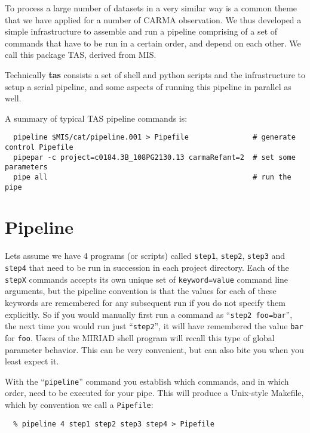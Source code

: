 \documentclass[preprint]{aastex} %
\begin{document}
To process a large number of datasets in a very similar 
way is a common theme that we have applied for a number of CARMA
observation. We thus developed
a simple infrastructure to assemble and run a pipeline comprising
of a set of commands that have to be run in a certain order,
and depend on each other. We call this 
package TAS, derived from MIS.

Technically {\bf tas} consists a set of shell and python scripts
and the infrastructure to setup a serial pipeline, and some aspects
of running this pipeline in parallel as well.

A summary of typical TAS pipeline commands is:

\footnotesize
\begin{verbatim}
  pipeline $MIS/cat/pipeline.001 > Pipefile               # generate control Pipefile
  pipepar -c project=c0184.3B_108PG2130.13 carmaRefant=2  # set some parameters
  pipe all                                                # run the pipe
\end{verbatim}
\normalsize   


\section{Pipeline}

Lets assume we have 4 programs (or scripts) called {\tt step1},
{\tt step2}, {\tt step3} and {\tt step4} that need to be run in
succession in each project directory. 
Each of the {\tt stepX} 
commands accepts its own unique set of {\tt keyword=value}
command line arguments, 
but the pipeline convention is that the values for each of these
keywords are remembered for any subsequent run if you do not
specify them explicitly. So if you would manually
first run a command as ``{\tt step2 foo=bar}'', 
the next time you would run just
``{\tt step2}'', it will have remembered the value
{\tt bar} for {\tt foo}. Users of the MIRIAD shell
program will recall this type of global parameter behavior. This
can be very convenient, but can also bite you when you least expect it.

With the ``{\tt pipeline}'' command you establish which commands,
and in which order, need to be executed for your pipe. This will
produce a Unix-style Makefile, which by convention we call a
{\tt Pipefile}:

\footnotesize
\begin{verbatim}
  % pipeline 4 step1 step2 step3 step4 > Pipefile
\end{verbatim}
\normalsize   
\end{document}
